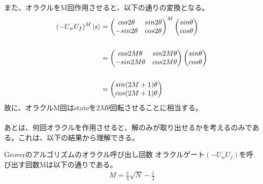 \documentclass[a4paper,10.5pt]{article}
\numberwithin{equation}{section}
\begin{document}
また、オラクルをM回作用させると、以下の通りの変換となる。
\begin{align*}
    (-U_{w}U_{f})^{M}\ket{s}&= \begin{pmatrix}
   cos2\theta & sin2\theta \\-sin2\theta & cos2\theta
    \end{pmatrix}^{M}\begin{pmatrix}
   sin\theta \\ cos\theta
    \end{pmatrix}\\
    \\
    &=\begin{pmatrix}
   cos2M\theta & sin2M\theta \\-sin2M\theta & cos2M\theta
    \end{pmatrix}
    \begin{pmatrix}
   sin\theta \\ cos\theta
    \end{pmatrix}\\
    \\
    &=\begin{pmatrix}
   sin(2M+1)\theta \\ cos(2M+1)\theta
    \end{pmatrix}
\end{align*}
故に、オラクルM回はstateを$2M\theta$回転させることに相当する。\\
\\
あとは、何回オラクルを作用させると、解のみが取り出せるかを考えるのみである。これは、以下の結果から理解できる。
\begin{resultbox}{Groverのアルゴリズムのオラクル呼び出し回数}
    オラクルゲート$(-U_{w}U_{f})$を呼び出す回数Mは以下の通りである。
    \begin{align*}
        M=\frac{\pi}{4}\sqrt{N}-\frac{1}{2}
    \end{align*}
\end{resultbox}
\end{document}
